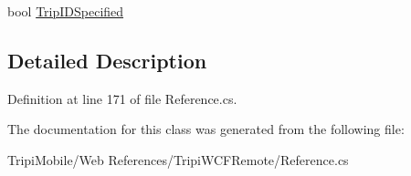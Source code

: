 \begin{DoxyCompactItemize}
\begin{DoxyCompactList}\small\item\em \item\end{DoxyCompactList}\item 
\hypertarget{class_tripi_1_1_tripi_w_c_f_remote_1_1_position_node_a6bd4c6a4e6d50b2b4e78ad7acbee056a}{
bool \hyperlink{class_tripi_1_1_tripi_w_c_f_remote_1_1_position_node_a6bd4c6a4e6d50b2b4e78ad7acbee056a}{TripIDSpecified}}
\label{class_tripi_1_1_tripi_w_c_f_remote_1_1_position_node_a6bd4c6a4e6d50b2b4e78ad7acbee056a}

\begin{DoxyCompactList}\small\item\em \item\end{DoxyCompactList}\end{DoxyCompactItemize}


\subsection{Detailed Description}


Definition at line 171 of file Reference.cs.

The documentation for this class was generated from the following file:\begin{DoxyCompactItemize}
\item 
TripiMobile/Web References/TripiWCFRemote/Reference.cs\end{DoxyCompactItemize}
